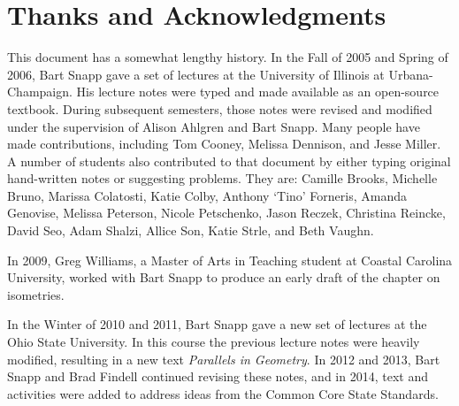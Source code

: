 \section*{Thanks and Acknowledgments}

This document has a somewhat lengthy history. In the Fall of 2005 and
Spring of 2006, Bart Snapp gave a set of lectures at the University of
Illinois at Urbana-Champaign. His lecture notes were typed and made
available as an open-source textbook. During subsequent semesters, those notes
were revised and modified under the supervision of Alison Ahlgren and
Bart Snapp. Many people have made contributions,
including Tom Cooney, Melissa Dennison, and Jesse Miller. A number of
students also contributed to that document by either typing original
hand-written notes or suggesting problems. They are: Camille Brooks,
Michelle Bruno, Marissa Colatosti, Katie Colby, Anthony `Tino'
Forneris, Amanda Genovise, Melissa Peterson, Nicole Petschenko, Jason
Reczek, Christina Reincke, David Seo, Adam Shalzi, Allice Son, Katie
Strle, and Beth Vaughn.

In 2009, Greg Williams, a Master of Arts in Teaching student at
Coastal Carolina University, worked with Bart Snapp to produce an
early draft of the chapter on isometries.

In the Winter of 2010 and 2011, Bart Snapp gave a new set of lectures
at the Ohio State University. In this course the previous lecture
notes were heavily modified, resulting in a new text \textit{Parallels
in Geometry}.  In 2012 and 2013, Bart Snapp and Brad Findell 
continued revising these notes, and in 2014, text and activities were
added to address ideas from the Common Core State Standards.  

\makeatletter %
\renewcommand{\l@section}{\@dottedtocline{1}{5em}{5em}}
\renewcommand{\l@subsection}{\@dottedtocline{2}{5em}{5em}}
\renewcommand{\l@subsubsection}{\@dottedtocline{3}{5em}{5em}}
\makeatother


\setcounter{tocdepth}{1}
\tableofcontents
